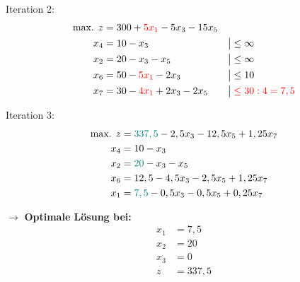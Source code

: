 \documentclass[a4paper,11pt]{article}
\begin{document}
Iteration 2:
\begin{align*}
    \text{max. } z &= 300 + {\color{red}5x_{1}} - 5x_{3} - 15x_{5} && \\
    x_{4} &= 10 - x_{3} && \big| \le \infty \\
    x_{2} &= 20 - x_{3} - x_{5} && \big| \le \infty \\
    x_{6} &= 50 - {\color{red}5x_{1}} - 2x_{3} && \big| \le 10 \\
    x_{7} &= 30 - {\color{red}4x_{1}} + 2x_{3} - 2x_{5} && \big| \color{red} \le 30:4=7,5 \\
\end{align*}

Iteration 3:
\begin{align*}
    \text{max. } z &= {\color{teal}337,5} - 2,5x_{3} - 12,5x_{5} + 1,25x_{7} \\
    x_{4} &= 10 - x_{3} \\
    x_{2} &= {\color{teal}20} - x_{3} - x_{5} \\
    x_{6} &= 12,5 - 4,5x_{3} - 2,5x_{5} +1,25x_{7} \\
    x_{1} &= {\color{teal}7,5} - 0,5x_{3} - 0,5x_{5} + 0,25x_{7} \\
\end{align*}

$\to$ \textbf{Optimale Lösung bei:}
\begin{align*}
    x_{1} &= 7,5 \\
    x_{2} &= 20 \\
    x_{3} &= 0 \\
    z &= 337,5 \\
\end{align*}
\end{document}

